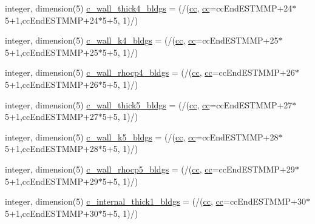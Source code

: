 \begin{DoxyCompactItemize}
\item 
integer, dimension(5) \hyperlink{namespaceallocatearray_a044a0c470735dd407e5d5fb0a536540a}{c\+\_\+wall\+\_\+thick4\+\_\+bldgs} = (/(\hyperlink{namespaceallocatearray_ac863c81704eb507dee10f5e10741e10c}{cc}, \hyperlink{namespaceallocatearray_ac863c81704eb507dee10f5e10741e10c}{cc}=cc\+End\+E\+S\+T\+M\+MP+24$\ast$5+1,cc\+End\+E\+S\+T\+M\+MP+24$\ast$5+5, 1)/)
\item 
integer, dimension(5) \hyperlink{namespaceallocatearray_ae9a73533916e4cc62f3cec0c85f0d985}{c\+\_\+wall\+\_\+k4\+\_\+bldgs} = (/(\hyperlink{namespaceallocatearray_ac863c81704eb507dee10f5e10741e10c}{cc}, \hyperlink{namespaceallocatearray_ac863c81704eb507dee10f5e10741e10c}{cc}=cc\+End\+E\+S\+T\+M\+MP+25$\ast$5+1,cc\+End\+E\+S\+T\+M\+MP+25$\ast$5+5, 1)/)
\item 
integer, dimension(5) \hyperlink{namespaceallocatearray_ae0bee70a024e2e4204e3c0e2ea43fe0c}{c\+\_\+wall\+\_\+rhocp4\+\_\+bldgs} = (/(\hyperlink{namespaceallocatearray_ac863c81704eb507dee10f5e10741e10c}{cc}, \hyperlink{namespaceallocatearray_ac863c81704eb507dee10f5e10741e10c}{cc}=cc\+End\+E\+S\+T\+M\+MP+26$\ast$5+1,cc\+End\+E\+S\+T\+M\+MP+26$\ast$5+5, 1)/)
\item 
integer, dimension(5) \hyperlink{namespaceallocatearray_ad95655da9944167e0208bf8454674fb6}{c\+\_\+wall\+\_\+thick5\+\_\+bldgs} = (/(\hyperlink{namespaceallocatearray_ac863c81704eb507dee10f5e10741e10c}{cc}, \hyperlink{namespaceallocatearray_ac863c81704eb507dee10f5e10741e10c}{cc}=cc\+End\+E\+S\+T\+M\+MP+27$\ast$5+1,cc\+End\+E\+S\+T\+M\+MP+27$\ast$5+5, 1)/)
\item 
integer, dimension(5) \hyperlink{namespaceallocatearray_a53001a7584fdc2aafd07c9e6809df27f}{c\+\_\+wall\+\_\+k5\+\_\+bldgs} = (/(\hyperlink{namespaceallocatearray_ac863c81704eb507dee10f5e10741e10c}{cc}, \hyperlink{namespaceallocatearray_ac863c81704eb507dee10f5e10741e10c}{cc}=cc\+End\+E\+S\+T\+M\+MP+28$\ast$5+1,cc\+End\+E\+S\+T\+M\+MP+28$\ast$5+5, 1)/)
\item 
integer, dimension(5) \hyperlink{namespaceallocatearray_a9fd17628369d7e612fbb9190cf2c92f2}{c\+\_\+wall\+\_\+rhocp5\+\_\+bldgs} = (/(\hyperlink{namespaceallocatearray_ac863c81704eb507dee10f5e10741e10c}{cc}, \hyperlink{namespaceallocatearray_ac863c81704eb507dee10f5e10741e10c}{cc}=cc\+End\+E\+S\+T\+M\+MP+29$\ast$5+1,cc\+End\+E\+S\+T\+M\+MP+29$\ast$5+5, 1)/)
\item 
integer, dimension(5) \hyperlink{namespaceallocatearray_a36130c9abba030f79380a76d8a252f2a}{c\+\_\+internal\+\_\+thick1\+\_\+bldgs} = (/(\hyperlink{namespaceallocatearray_ac863c81704eb507dee10f5e10741e10c}{cc}, \hyperlink{namespaceallocatearray_ac863c81704eb507dee10f5e10741e10c}{cc}=cc\+End\+E\+S\+T\+M\+MP+30$\ast$5+1,cc\+End\+E\+S\+T\+M\+MP+30$\ast$5+5, 1)/)

\end{DoxyCompactItemize}
